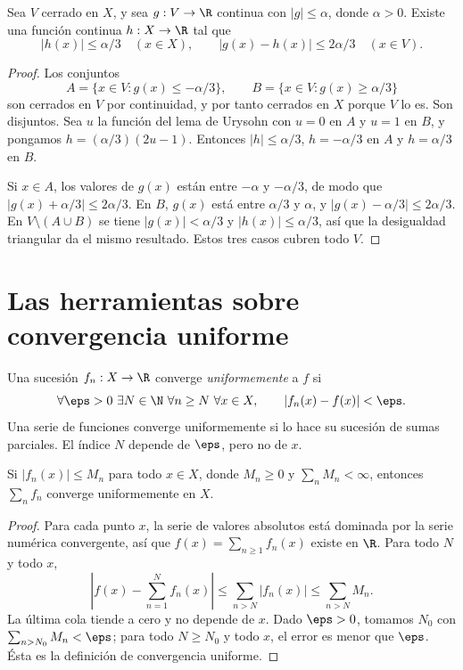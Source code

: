 \begin{lema}\label{ch12:correccion}
Sea $V$ cerrado en $X$, y sea $g:V\to\R$ continua con $|g|\leq\alpha$, donde $\alpha>0$. Existe una función continua $h:X\to\R$ tal que
\[
 |h(x)|\leq\alpha/3\quad(x\in X),\qquad
 |g(x)-h(x)|\leq2\alpha/3\quad(x\in V).
\]
\end{lema}
\begin{proof}
Los conjuntos
\[
 A=\{x\in V:g(x)\leq-\alpha/3\},\qquad
 B=\{x\in V:g(x)\geq\alpha/3\}
\]
son cerrados en $V$ por continuidad, y por tanto cerrados en $X$ porque $V$ lo es. Son disjuntos. Sea $u$ la función del lema de Urysohn con $u=0$ en $A$ y $u=1$ en $B$, y pongamos $h=(\alpha/3)(2u-1)$. Entonces $|h|\leq\alpha/3$, $h=-\alpha/3$ en $A$ y $h=\alpha/3$ en $B$.

Si $x\in A$, los valores de $g(x)$ están entre $-\alpha$ y $-\alpha/3$, de modo que $|g(x)+\alpha/3|\leq2\alpha/3$. En $B$, $g(x)$ está entre $\alpha/3$ y $\alpha$, y $|g(x)-\alpha/3|\leq2\alpha/3$. En $V\setminus(A\cup B)$ se tiene $|g(x)|<\alpha/3$ y $|h(x)|\leq\alpha/3$, así que la desigualdad triangular da el mismo resultado. Estos tres casos cubren todo $V$.
\end{proof}

\section{Las herramientas sobre convergencia uniforme}
\begin{definicion}
Una sucesión $f_n:X\to\R$ converge \emph{uniformemente} a $f$ si
\[
 \forall\eps>0\ \exists N\in\N\ \forall n\geq N\ \forall x\in X,
 \qquad |f_n(x)-f(x)|<\eps.
\]
Una serie de funciones converge uniformemente si lo hace su sucesión de sumas parciales. El índice $N$ depende de $\eps$, pero no de $x$.
\end{definicion}

\begin{teorema}\label{ch12:weierstrass}
Si $|f_n(x)|\leq M_n$ para todo $x\in X$, donde $M_n\geq0$ y $\sum_nM_n<\infty$, entonces $\sum_nf_n$ converge uniformemente en $X$.
\end{teorema}
\begin{proof}
Para cada punto $x$, la serie de valores absolutos está dominada por la serie numérica convergente, así que $f(x)=\sum_{n\geq1}f_n(x)$ existe en $\R$. Para todo $N$ y todo $x$,
\[
 \left|f(x)-\sum_{n=1}^Nf_n(x)\right|
 \leq\sum_{n>N}|f_n(x)|\leq\sum_{n>N}M_n.
\]
La última cola tiende a cero y no depende de $x$. Dado $\eps>0$, tomamos $N_0$ con $\sum_{n>N_0}M_n<\eps$; para todo $N\geq N_0$ y todo $x$, el error es menor que $\eps$. Ésta es la definición de convergencia uniforme.
\end{proof}

